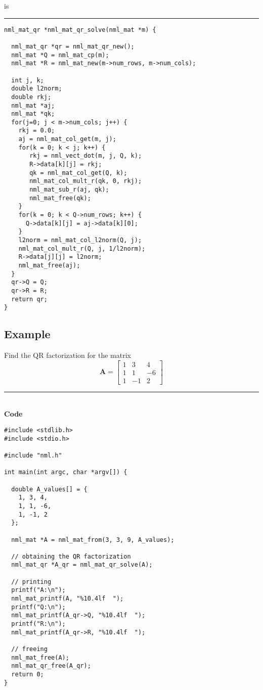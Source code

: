 is

\rule{\textwidth}{0.5pt}
\begin{verbatim}
nml_mat_qr *nml_mat_qr_solve(nml_mat *m) {

  nml_mat_qr *qr = nml_mat_qr_new();
  nml_mat *Q = nml_mat_cp(m);
  nml_mat *R = nml_mat_new(m->num_rows, m->num_cols);

  int j, k;
  double l2norm;
  double rkj;
  nml_mat *aj;
  nml_mat *qk;
  for(j=0; j < m->num_cols; j++) {    
    rkj = 0.0;
    aj = nml_mat_col_get(m, j);
    for(k = 0; k < j; k++) {
       rkj = nml_vect_dot(m, j, Q, k);
       R->data[k][j] = rkj;
       qk = nml_mat_col_get(Q, k);
       nml_mat_col_mult_r(qk, 0, rkj);
       nml_mat_sub_r(aj, qk);
       nml_mat_free(qk);
    }
    for(k = 0; k < Q->num_rows; k++) {
      Q->data[k][j] = aj->data[k][0];
    }
    l2norm = nml_mat_col_l2norm(Q, j);
    nml_mat_col_mult_r(Q, j, 1/l2norm);
    R->data[j][j] = l2norm;
    nml_mat_free(aj);
  }
  qr->Q = Q;
  qr->R = R;
  return qr;
} 
\end{verbatim}

\subsection{Example}

\textsf{
\example Find the QR factorization for the matrix
$$
\mathbf{A} = \left[
\begin{array}{rrr}
1 & 3 & 4 \\
1 & 1 & -6 \\
1 & -1 & 2
\end{array}
\right]
$$
}

\rule{80mm}{0.5pt}\\
{\bf Code}
\begin{verbatim}
#include <stdlib.h>
#include <stdio.h>

#include "nml.h"

int main(int argc, char *argv[]) {

  double A_values[] = {
    1, 3, 4,
    1, 1, -6,
    1, -1, 2
  };

  nml_mat *A = nml_mat_from(3, 3, 9, A_values);

  // obtaining the QR factorization
  nml_mat_qr *A_qr = nml_mat_qr_solve(A);

  // printing
  printf("A:\n");
  nml_mat_printf(A, "%10.4lf  ");
  printf("Q:\n");
  nml_mat_printf(A_qr->Q, "%10.4lf  ");
  printf("R:\n");
  nml_mat_printf(A_qr->R, "%10.4lf  ");

  // freeing
  nml_mat_free(A); 
  nml_mat_qr_free(A_qr);
  return 0;
}
\end{verbatim}

